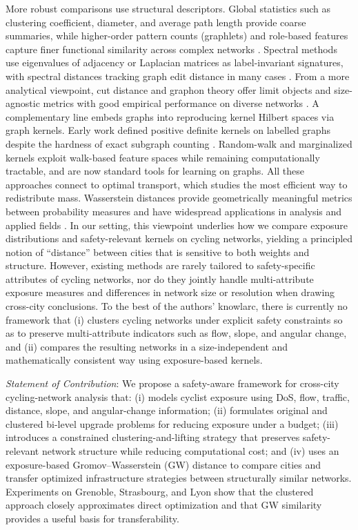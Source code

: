 \documentclass[lettersize,journal]{IEEEtran}
\begin{document}
More robust comparisons use structural descriptors. Global statistics such as clustering coefficient, diameter, and average path length provide coarse summaries, while higher-order pattern counts (graphlets) and role-based features capture finer functional similarity across complex networks \cite{yaverouglu2014revealing,faisal2017grafene}. Spectral methods use eigenvalues of adjacency or Laplacian matrices as label-invariant signatures, with spectral distances tracking graph edit distance in many cases \cite{wilson2008study}. From a more analytical viewpoint, cut distance and graphon theory offer limit objects and size-agnostic metrics with good empirical performance on diverse networks \cite{liu2018cut}. A complementary line embeds graphs into reproducing kernel Hilbert spaces via graph kernels. Early work defined positive definite kernels on labelled graphs despite the hardness of exact subgraph counting \cite{gartner2003graph}. Random-walk and marginalized kernels \cite{kashima2003marginalized,vishwanathan2010graph} exploit walk-based feature spaces while remaining computationally tractable, and are now standard tools for learning on graphs. All these approaches connect to optimal transport, which studies the most efficient way to redistribute mass. Wasserstein distances provide geometrically meaningful metrics between probability measures and have widespread applications in analysis and applied fields \cite{villani2008optimal,villani2021topics,santambrogio2015optimal}. In our setting, this viewpoint underlies how we compare exposure distributions and safety-relevant kernels on cycling networks, yielding a principled notion of “distance” between cities that is sensitive to both weights and structure. However, existing methods are rarely tailored to safety-specific attributes of cycling networks, nor do they jointly handle multi-attribute exposure measures and differences in network size or resolution when drawing cross-city conclusions. To the best of the authors' knowlarc, there is currently no framework that (i) clusters cycling networks under explicit safety constraints so as to preserve multi-attribute indicators such as flow, slope, and angular change, and (ii) compares the resulting networks in a size-independent and mathematically consistent way using exposure-based kernels.

\textit{Statement of Contribution}: We propose a safety-aware framework for cross-city cycling-network analysis that:
(i) models cyclist exposure using DoS, flow, traffic, distance, slope, and
angular-change information; (ii) formulates original and clustered bi-level
upgrade problems for reducing exposure under a budget; (iii) introduces a
constrained clustering-and-lifting strategy that preserves safety-relevant
network structure while reducing computational cost; and (iv) uses an
exposure-based Gromov--Wasserstein (GW) distance to compare cities and transfer
optimized infrastructure strategies between structurally similar networks.
Experiments on Grenoble, Strasbourg, and Lyon show that the clustered approach
closely approximates direct optimization and that GW similarity provides a useful
basis for transferability.
\end{document}
